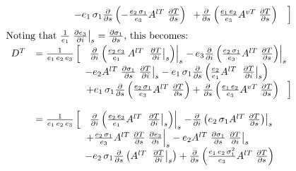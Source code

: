 \documentclass[../main/NEMO_manual]{subfiles}
\begin{document}
\begin{align*}
{\begin{array}{*{20}l}
       &  \qquad \qquad \quad \shoveright{ -e_1 \,\sigma_1 \frac{\partial }{\partial s}\left( {-\frac{e_2 \,\sigma_1 }{e_3 }A^{lT}\;\frac{\partial T}{\partial s}} \right)\;\,\left. {+\frac{\partial }{\partial s}\left( {\frac{e_1 \,e_2 }{e_3 }A^{vT}\;\frac{\partial T}{\partial s}} \right)\quad} \right] }\\
  \end{array}
  } 		\\
  {
  \begin{array}{*{20}l}
    \intertext{Noting that $\frac{1}{e_1} \left. \frac{\partial e_3 }{\partial i} \right|_s = \frac{\partial \sigma_1 }{\partial s}$, this becomes:}
    D^T & =\frac{1}{e_1\,e_2\,e_3 }\left[ {\left. {\;\;\;\frac{\partial }{\partial i}\left( {\frac{e_2\,e_3 }{e_1}\,A^{lT}\;\left. {\frac{\partial T}{\partial i}} \right|_s } \right)} \right|_s \left. -\, {e_3 \frac{\partial }{\partial i}\left( {\frac{e_2 \,\sigma_1 }{e_3 }A^{lT}\;\frac{\partial T}{\partial s}} \right)} \right|_s } \right. \\
    & \qquad \qquad \quad -e_2 A^{lT}\;\frac{\partial \sigma_1 }{\partial s}\left. {\frac{\partial T}{\partial i}} \right|_s -e_1 \,\sigma_1 \frac{\partial }{\partial s}\left( {\frac{e_2 }{e_1 }A^{lT}\;\left. {\frac{\partial T}{\partial i}} \right|_s } \right) \\
    & \qquad \qquad \quad\shoveright{ \left. { +e_1 \,\sigma_1 \frac{\partial }{\partial s}\left( {\frac{e_2 \,\sigma_1 }{e_3 }A^{lT}\;\frac{\partial T}{\partial s}} \right)+\frac{\partial }{\partial s}\left( {\frac{e_1 \,e_2 }{e_3 }A^{vT}\;\frac{\partial T}{\partial s}} \right)\;\;\;} \right] }\\
    \\
    &=\frac{1}{e_1 \,e_2 \,e_3 } \left[ {\left. {\;\;\;\frac{\partial }{\partial i} \left( {\frac{e_2 \,e_3 }{e_1 }A^{lT}\;\left. {\frac{\partial T}{\partial i}} \right|_s } \right)} \right|_s \left. {-\frac{\partial }{\partial i}\left( {e_2 \,\sigma_1 A^{lT}\;\frac{\partial T}{\partial s}} \right)} \right|_s } \right. \\
    & \qquad \qquad \quad \left. {+\frac{e_2 \,\sigma_1 }{e_3}A^{lT}\;\frac{\partial T}{\partial s} \;\frac{\partial e_3 }{\partial i}}  \right|_s -e_2 A^{lT}\;\frac{\partial \sigma_1 }{\partial s}\left. {\frac{\partial T}{\partial i}} \right|_s \\
    & \qquad \qquad \quad-e_2 \,\sigma_1 \frac{\partial}{\partial s}\left( {A^{lT}\;\left. {\frac{\partial T}{\partial i}} \right|_s } \right)+\frac{\partial }{\partial s}\left( {\frac{e_1 \,e_2 \,\sigma_1 ^2}{e_3 }A^{lT}\;\frac{\partial T}{\partial s}} \right) \\

\end{array}}
\end{align*}
\end{document}
